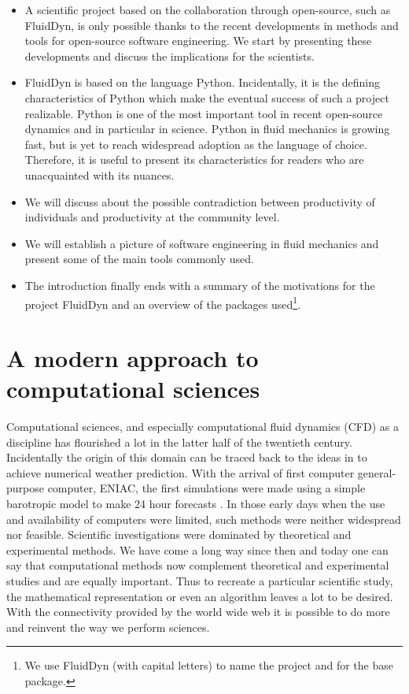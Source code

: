 \begin{itemize}
\item A scientific project based on the collaboration through open-source, such
as FluidDyn, is only possible thanks to the recent developments in methods and
tools for open-source software engineering. We start by presenting these
developments and discuss the implications for the scientists.

\item FluidDyn is based on the language Python. Incidentally, it is the defining
characteristics of Python which make the eventual success of such a
project realizable.
%
Python is one of the most important tool in recent open-source dynamics and in
particular in science.
%
Python in fluid mechanics is growing fast, but is yet to reach widespread
adoption as the language of choice. Therefore, it is useful to present its
characteristics for readers who are unacquainted with its nuances.

\item We will discuss about the possible contradiction between productivity of
individuals and productivity at the community level.

\item We will establish a picture of software engineering in fluid mechanics
and present some of the main tools commonly used.

\item The introduction finally ends with a summary of the motivations for the
project FluidDyn and an overview of the packages used\footnote{%
  We use FluidDyn (with capital letters) to name the project and \fluiddyn for
the base package.}.
\end{itemize}


\section{A modern approach to computational sciences}

Computational sciences, and especially computational fluid dynamics (CFD) as a
discipline has flourished a lot in the latter half of the twentieth century.
Incidentally the origin of this domain can be traced back to the ideas
in \citet{richardson_weather_1922} to achieve numerical weather prediction.
With the arrival of first computer general-purpose computer, ENIAC, the first
simulations were made using a simple barotropic model to make 24 hour
forecasts \citep{lynch_richardson_2010}. In those early days when the use and
availability of computers were limited, such methods were neither widespread
nor feasible. Scientific investigations were dominated by theoretical and
experimental methods.
We have come a long way since then and today one can say that computational
methods now complement theoretical and experimental studies and are equally
important.
Thus to recreate a particular scientific study, the mathematical representation
or even an algorithm leaves a lot to be desired. With the connectivity
provided by the world wide web it is possible to do more and reinvent the way
we perform sciences.

